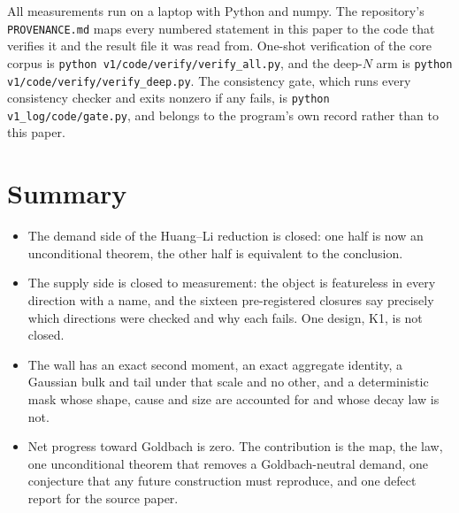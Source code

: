 \documentclass[11pt,a4paper]{article}
\theoremstyle{plain}
\theoremstyle{definition}
\begin{document}
All measurements run on a laptop with Python and numpy. The
repository's \texttt{PROVENANCE.md} maps every numbered statement in
this paper to the code that verifies it and the result file it was
read from. One-shot verification of the core corpus is
\texttt{python v1/code/verify/verify\_all.py}, and the deep-$N$ arm is
\texttt{python v1/code/verify/verify\_deep.py}. The consistency gate, which runs
every consistency checker and exits nonzero if any fails, is
\texttt{python v1\_log/code/gate.py}, and belongs to the program's
own record rather than to this paper.

\section{Summary}

\begin{itemize}
\item The demand side of the Huang--Li reduction is closed: one half
  is now an unconditional theorem, the other half is equivalent to the
  conclusion.
\item The supply side is closed to measurement: the object is
  featureless in every direction with a name, and the sixteen
  pre-registered closures say precisely which directions were checked
  and why each fails. One design, K1, is not closed.
\item The wall has an exact second moment, an exact aggregate identity,
  a Gaussian bulk and tail under that scale and no other, and a
  deterministic mask whose shape, cause and size are accounted for and
  whose decay law is not.
\item Net progress toward Goldbach is zero. The contribution is the
  map, the law, one unconditional theorem that removes a
  Goldbach-neutral demand, one conjecture that any future construction
  must reproduce, and one defect report for the source paper.
\end{itemize}
\end{document}
